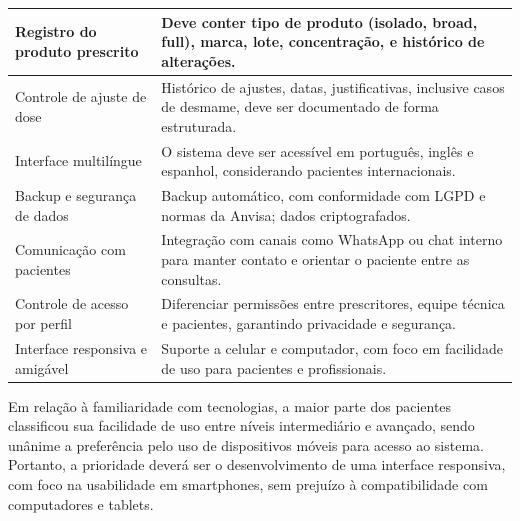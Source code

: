 \href{}{}\documentclass[12pt,portuguese,oneside]{article}
\begin{document}
\begin{table}[H]
\begin{tabularx}{\textwidth}{|>{\raggedright\arraybackslash}p{4.2cm}|>{\raggedright\arraybackslash}X|}
\hline
Registro do produto prescrito & Deve conter tipo de produto (isolado, broad, full), marca, lote, concentração, e histórico de alterações. \\
\hline
Controle de ajuste de dose & Histórico de ajustes, datas, justificativas, inclusive casos de desmame, deve ser documentado de forma estruturada. \\
\hline
Interface multilíngue & O sistema deve ser acessível em português, inglês e espanhol, considerando pacientes internacionais. \\
\hline
Backup e segurança de dados & Backup automático, com conformidade com LGPD e normas da Anvisa; dados criptografados. \\
\hline
Comunicação com pacientes & Integração com canais como WhatsApp ou chat interno para manter contato e orientar o paciente entre as consultas. \\
\hline
Controle de acesso por perfil & Diferenciar permissões entre prescritores, equipe técnica e pacientes, garantindo privacidade e segurança. \\
\hline
Interface responsiva e amigável & Suporte a celular e computador, com foco em facilidade de uso para pacientes e profissionais. \\
\hline
\end{tabularx}
\end{table}




Em relação à familiaridade com tecnologias, a maior parte dos pacientes classificou sua facilidade de uso entre níveis intermediário e avançado, sendo unânime a preferência pelo uso de dispositivos móveis para acesso ao sistema. Portanto, a prioridade deverá ser o desenvolvimento de uma interface responsiva, com foco na usabilidade em smartphones, sem prejuízo à compatibilidade com computadores e tablets.
\end{document}
